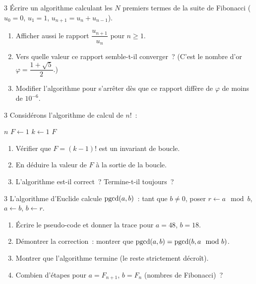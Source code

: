 \begin{exo}{3}
\'Ecrire un algorithme calculant les $N$ premiers termes de la suite
de Fibonacci ($u_0=0$, $u_1=1$, $u_{n+1}=u_n+u_{n-1}$).
\begin{enumerate}
  \item Afficher aussi le rapport $\dfrac{u_{n+1}}{u_n}$ pour $n \geq 1$.
  \item Vers quelle valeur ce rapport semble-t-il converger~?
        (C'est le nombre d'or $\varphi = \dfrac{1+\sqrt{5}}{2}$.)
  \item Modifier l'algorithme pour s'arr\^eter d\`es que ce rapport
        diff\`ere de $\varphi$ de moins de $10^{-6}$.
\end{enumerate}
\end{exo}

\begin{exo}{3}
Consid\'erons l'algorithme de calcul de $n!$~:
\begin{algorithm}[H]
\caption{Calcul it\'eratif de $n!$}
\Lire $n$\;
$F \leftarrow 1$\;
$k \leftarrow 1$\;
\Afficher $F$\;
\end{algorithm}
\begin{enumerate}
  \item V\'erifier que $F = (k-1)!$ est un invariant de boucle.
  \item En d\'eduire la valeur de $F$ \`a la sortie de la boucle.
  \item L'algorithme est-il correct~? Termine-t-il toujours~?
\end{enumerate}
\end{exo}

\begin{exo}{3}
L'algorithme d'Euclide calcule $\operatorname{pgcd}(a,b)$~:
tant que $b \ne 0$, poser $r \leftarrow a \mod b$, $a \leftarrow b$, $b \leftarrow r$.
\begin{enumerate}
  \item \'Ecrire le pseudo-code et donner la trace pour $a=48$, $b=18$.
  \item D\'emontrer la correction~: montrer que $\operatorname{pgcd}(a,b) = \operatorname{pgcd}(b, a\mod b)$.
  \item Montrer que l'algorithme termine (le reste strictement d\'ecro\^it).
  \item Combien d'\'etapes pour $a=F_{n+1}$, $b=F_n$ (nombres de Fibonacci)~?
\end{enumerate}
\end{exo}

